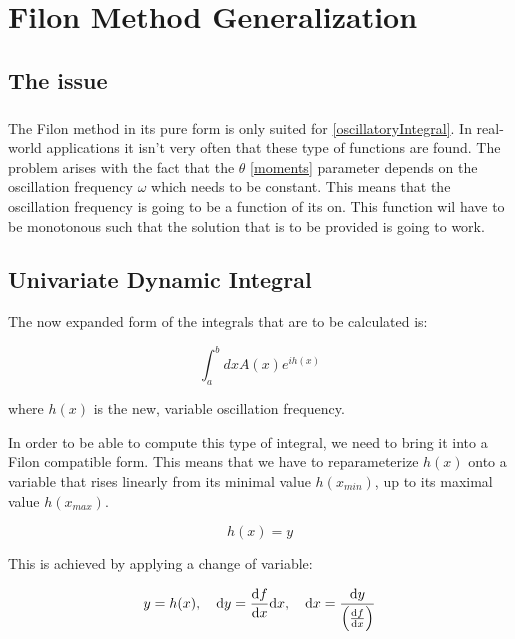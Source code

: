 \chapter{Filon Method Generalization}

\section{The issue}

\paragraph{} The Filon method in its pure form is only suited for \eqref{oscillatoryIntegral}.
In real-world applications it isn't very often that these type of functions are found. The problem arises with the fact that the $\theta$ \eqref{moments} parameter depends on the oscillation frequency $\omega$ which needs to be constant.
This means that the oscillation frequency is going to be a function of its on. This function wil have to be monotonous such that the solution that is to be provided is going to work. 

\section{Univariate Dynamic Integral}

The now expanded\cite{art2} form of the integrals that are to be calculated is:

\begin{equation}
    \int_{a}^{b}dxA(x)e^{ih(x)}
\end{equation}

where $h(x)$ is the new, variable oscillation frequency.

In order to be able to compute this type of integral, we need to bring it into a Filon compatible form. This means that we have to reparameterize $h(x)$ onto a variable that rises linearly from its minimal value $h(x_{min})$, up to its maximal value $h(x_{max})$.

\begin{equation}
    h(x)=y \label{parameterization}   
\end{equation}

This is achieved by applying a change of variable:

\begin{equation}
    y=h(x), \quad \dd y=\dv{f}{x} \dd x, \quad \dd x=\frac{\dd y}{\left(\dv{f}{x}\right)} \label{changeOfVariable}
\end{equation}

